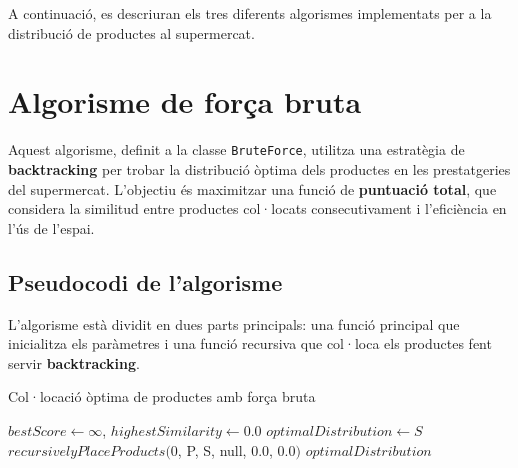 \documentclass[a4paper,12pt]{report}
\begin{document}
A continuació, es descriuran els tres diferents algorismes implementats per a la distribució de productes al supermercat.

\section{Algorisme de força bruta}

Aquest algorisme, definit a la classe \texttt{BruteForce}, utilitza una estratègia de \textbf{backtracking} per trobar la distribució òptima dels productes en les prestatgeries del supermercat. L'objectiu és maximitzar una funció de \textbf{puntuació total}, que considera la similitud entre productes col·locats consecutivament i l'eficiència en l'ús de l'espai.

\subsection{Pseudocodi de l'algorisme}
L'algorisme està dividit en dues parts principals: una funció principal que inicialitza els paràmetres i una funció recursiva que col·loca els productes fent servir \textbf{backtracking}.
\newline
\begin{algorithm}[H]
	\SetAlgoVlined
		\caption{Col·locació òptima de productes amb força bruta}
		$bestScore \gets \infty$, $highestSimilarity \gets 0.0$\;
		$optimalDistribution \gets S$\;
		$recursivelyPlaceProducts($0, P, S, null, 0.0, 0.0$)$\;
	\Return $optimalDistribution$\;

	\

\end{algorithm}
\end{document}
